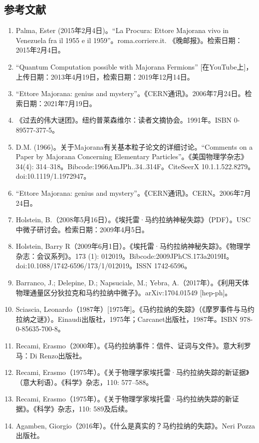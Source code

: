\subsection{参考文献}
\begin{enumerate}
\item Palma, Ester (2015年2月4日)。“La Procura: Ettore Majorana vivo in Venezuela fra il 1955 e il 1959”。roma.corriere.it. 《晚邮报》。检索日期：2015年2月4日。
\item “Quantum Computation possible with Majorana Fermions” [在YouTube上]，上传日期：2013年4月19日，检索日期：2019年12月14日。
\item “Ettore Majorana: genius and mystery”。《CERN通讯》。2006年7月24日。检索日期：2021年7月19日。
\item 《过去的伟大谜团》。纽约普莱森维尔：读者文摘协会。1991年。ISBN 0-89577-377-5。
\item D.M. (1966)。关于Majorana有关基本粒子论文的详细讨论。“Comments on a Paper by Majorana Concerning Elementary Particles”。《美国物理学杂志》34(4): 314–318。Bibcode:1966AmJPh..34..314F。CiteSeerX 10.1.1.522.8279。doi:10.1119/1.1972947。
\item “Ettore Majorana: genius and mystery”。《CERN通讯》。CERN。2006年7月24日。
\item Holstein, B.（2008年5月16日）。《埃托雷·马约拉纳神秘失踪》（PDF）。USC中微子研讨会。检索日期：2009年4月5日。
\item Holstein, Barry R（2009年6月1日）。《埃托雷·马约拉纳神秘失踪》。《物理学杂志：会议系列》。173 (1): 012019。Bibcode:2009JPhCS.173a2019H。doi:10.1088/1742-6596/173/1/012019。ISSN 1742-6596。
\item Barranco, J.; Delepine, D.; Napsuciale, M.; Yebra, A.（2017年）。《利用天体物理通量区分狄拉克和马约拉纳中微子》。arXiv:1704.01549 [hep-ph]。
\item Sciascia, Leonardo（1987年）[1975年]。《马约拉纳的失踪》（《摩罗事件与马约拉纳之谜》）。Einaudi出版社，1975年；Carcanet出版社，1987年。ISBN 978-0-85635-700-8。
\item Recami, Erasmo（2000年）。《马约拉纳事件：信件、证词与文件》。意大利罗马：Di Renzo出版社。
\item Recami, Erasmo（1975年）。《关于物理学家埃托雷·马约拉纳失踪的新证据》（意大利语）。《科学》杂志，110: 577–588。
\item Recami, Erasmo（1975年）。《关于物理学家埃托雷·马约拉纳失踪的新证据》。《科学》杂志，110: 589及后续。
\item Agamben, Giorgio（2016年）。《什么是真实的？马约拉纳的失踪》。Neri Pozza出版社。

\end{enumerate}
